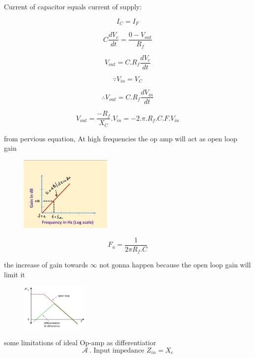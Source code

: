 \documentclass{article}
\begin{document}
    Current of capacitor equals current of supply:
    
    \[
    I_{C} = I_F
    \]
    
    \[
    C \frac{dV_c}{dt} = \frac{0-V_{out}}{R_f}   
    \]
    
    \[
    V_{out} = C.R_f\frac{dV_c}{dt}
    \]
    
    \[
    \because V_{in} = V_C
    \]
    
    \[
    \therefore V_{out} = C.R_f\frac{dV_{in}}{dt}
    \]
    
    \[
    V_{out}=\frac{-R_f}{X_C}.V_{in} = -2.\pi .R_f.C.F.V_{in}
    \]
    
    from pervious equation, At high frequencies the op amp will act as open loop gain
    \begin{figure}[h]
        \centering
        \includegraphics[width=0.4\textwidth]{ideal.jpg}
    \end{figure}
    
    \[
    F_a=\frac{1}{2\pi R_f.C}
    \]
    
    the increase of gain towards \(\infty\) not gonna happen because the open loop gain will limit it
    \begin{figure}[h]
        \centering
        \includegraphics[width=0.3\textwidth]{practical.jpg}
    \end{figure}

some limitations of ideal Op-amp as differentiatior
\[
\mathcal{A} \ \text{. Input impedance } Z_{in} = X_c
\]
\\
\end{document}
